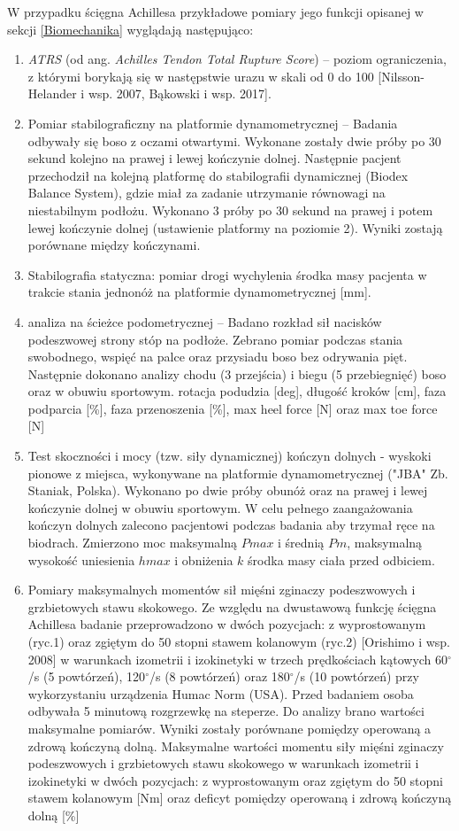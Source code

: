 W przypadku ścięgna Achillesa przykładowe pomiary jego funkcji opisanej w sekcji \ref{Biomechanika} wyglądają następująco:

\begin{enumerate}
	\item \textit{ATRS} (od ang. \textit{Achilles Tendon Total Rupture Score}) -- poziom ograniczenia, z którymi borykają się w następstwie urazu w skali od 0 do 100 [Nilsson-Helander i wsp. 2007, Bąkowski i wsp. 2017].
	\item Pomiar stabilograficzny na platformie dynamometrycznej -- Badania odbywały się boso z oczami otwartymi. Wykonane zostały dwie próby po 30 sekund kolejno na prawej i lewej kończynie dolnej. Następnie pacjent przechodził na kolejną platformę do stabilografii dynamicznej (Biodex Balance System), gdzie miał za zadanie utrzymanie równowagi na niestabilnym podłożu. Wykonano 3 próby po 30 sekund na prawej i potem lewej kończynie dolnej (ustawienie platformy na poziomie 2). Wyniki zostają porównane między kończynami. 
	\item Stabilografia statyczna: pomiar drogi wychylenia środka masy pacjenta w trakcie stania jednonóż na platformie dynamometrycznej [mm].
	\item analiza na ścieżce podometrycznej -- Badano rozkład sił nacisków podeszwowej strony stóp na podłoże. Zebrano pomiar podczas stania swobodnego, wspięć na palce oraz przysiadu boso bez odrywania pięt. Następnie dokonano analizy chodu (3 przejścia) i biegu (5 przebiegnięć) boso oraz w obuwiu sportowym. rotacja podudzia [deg], długość kroków [cm], faza podparcia [\%], faza przenoszenia [\%], max heel force [N] oraz max toe force [N]
	\item Test skoczności i mocy (tzw. siły dynamicznej) kończyn dolnych - wyskoki pionowe z miejsca, wykonywane na platformie dynamometrycznej ("JBA" Zb. Staniak, Polska). Wykonano po dwie próby obunóż oraz na prawej i lewej kończynie dolnej w obuwiu sportowym. W celu pełnego zaangażowania kończyn dolnych zalecono pacjentowi podczas badania aby trzymał ręce na biodrach. Zmierzono moc maksymalną $Pmax$ i średnią $Pm$, maksymalną wysokość uniesienia $hmax$ i obniżenia $k$ środka masy ciała przed odbiciem.
	\item Pomiary maksymalnych momentów sił mięśni zginaczy podeszwowych i grzbietowych stawu skokowego. Ze względu na dwustawową funkcję ścięgna Achillesa badanie przeprowadzono w dwóch pozycjach: z wyprostowanym (ryc.1) oraz zgiętym do 50 stopni stawem kolanowym (ryc.2) [Orishimo i wsp. 2008] w warunkach izometrii i izokinetyki w trzech prędkościach kątowych 60$^\circ$/s (5 powtórzeń), 120$^\circ$/s (8 powtórzeń) oraz 180$^\circ$/s (10 powtórzeń) przy wykorzystaniu urządzenia Humac Norm (USA). Przed badaniem osoba odbywała 5 minutową rozgrzewkę na steperze. Do analizy brano wartości maksymalne pomiarów. Wyniki zostały porównane pomiędzy operowaną a zdrową kończyną dolną. Maksymalne wartości momentu siły mięśni zginaczy podeszwowych i grzbietowych stawu skokowego w warunkach izometrii i izokinetyki w dwóch pozycjach: z wyprostowanym oraz zgiętym do 50 stopni stawem kolanowym [Nm] oraz deficyt pomiędzy operowaną i zdrową kończyną dolną [\%]
\end{enumerate}

